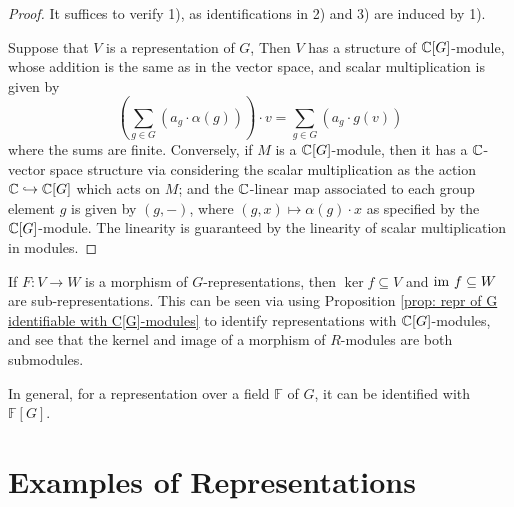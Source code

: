 \documentclass{article}
\begin{document}
\begin{proof}
    It suffices to verify 1), as identifications in 2) and 3) are induced by 1). 
    
    Suppose that $V$ is a representation of $G$, Then $V$ has a structure of $\mathbb{C}[G]$-module, whose addition is the same as in the vector space, and scalar multiplication is given by
    \[
        \left( \sum_{g \in G} (a_g \cdot \alpha(g)) \right) \cdot v = \sum_{g \in G} (a_g \cdot g(v))
    \]
    where the sums are finite. Conversely, if $M$ is a $\mathbb{C}[G]$-module, then it has a $\mathbb{C}$-vector space structure via considering the scalar multiplication as the action $\mathbb{C} \hookrightarrow \mathbb{C}[G]$ which acts on $M$; and the $\mathbb{C}$-linear map associated to each group element $g$ is given by $(g, -)$, where $(g, x) \mapsto \alpha(g) \cdot x$ as specified by the $\mathbb{C}[G]$-module. The linearity is guaranteed by the linearity of scalar multiplication in modules.
\end{proof}

\begin{corollary}\label{cor: kernel and image of morphism of repr. is repr.}
    If $F: V \to W$ is a morphism of $G$-representations, then $\ker f \subseteq V$ and $\mathrm{im}\  f \subseteq W$ are sub-representations. This can be seen via using Proposition \ref{prop: repr of G identifiable with C[G]-modules} to identify representations with $\mathbb{C}[G]$-modules, and see that the kernel and image of a morphism of $R$-modules are both submodules. 
\end{corollary}

\begin{remark}
    In general, for a representation over a field $\mathbb{F}$ of $G$, it can be identified with $\mathbb{F}[G]$.
\end{remark}

\section{Examples of Representations}
\end{document}
